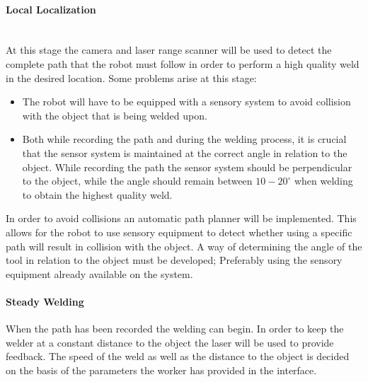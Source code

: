 \documentclass[11pt,a4paper]{article}
\begin{document}
\paragraph{Local Localization}~\\
At this stage the camera and laser range scanner will be used to detect the complete path that the robot must follow in order to perform a high quality weld in the desired location. Some problems arise at this stage:
\begin{itemize}
	\item[] The robot will have to be equipped with a sensory system to avoid collision with the object that is being welded upon. 
	\item[] Both while recording the path and during the welding process, it is crucial that the sensor system is maintained at the correct angle in relation to the object. While recording the path the sensor system should be perpendicular to the object, while the angle should remain between $10-20^\circ$ when welding to obtain the highest quality weld.
\end{itemize}
In order to avoid collisions an automatic path planner will be implemented. This allows for the robot to use sensory equipment to detect whether using a specific path will result in collision with the object.
A way of determining the angle of the tool in relation to the object must be developed; Preferably using the sensory equipment already available on the system.  
\paragraph{Steady Welding}
When the path has been recorded the welding can begin. In order to keep the welder at a constant distance to the object the laser will be used to provide feedback. The speed of the weld as well as the distance to the object is decided on the basis of the parameters the worker has provided in the interface.
\end{document}
